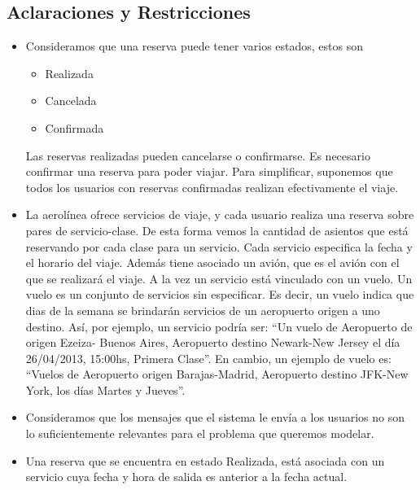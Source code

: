 \subsection{Aclaraciones y Restricciones}
  \begin{itemize}
    \item Consideramos que una reserva puede tener varios estados, estos son
          \begin{itemize}
            \item   Realizada
            \item   Cancelada
            \item   Confirmada
          \end{itemize}

          Las reservas realizadas pueden cancelarse o confirmarse.
          Es necesario confirmar una reserva para poder viajar.
          Para simplificar, suponemos que todos los usuarios con reservas
          confirmadas realizan efectivamente el viaje.
    
    \item La aerolínea ofrece servicios de viaje, y cada usuario realiza una
          reserva sobre pares de servicio-clase.
          De esta forma vemos la cantidad de asientos que está reservando por
          cada clase para un servicio.
          Cada servicio especifica la fecha y el horario del viaje. Además 
          tiene asociado un avión, que es el avión con el que se realizará
          el viaje.
          A la vez un servicio está vinculado con un vuelo. Un vuelo es
          un conjunto de servicios sin especificar. Es decir, un vuelo indica 
          que dias de la semana se brindarán servicios de un aeropuerto origen 
          a uno destino.
          Así, por ejemplo, un servicio podría ser:
          ``Un vuelo de Aeropuerto de origen Ezeiza- Buenos Aires, Aeropuerto 
          destino Newark-New Jersey el día 26/04/2013, 15:00hs, Primera Clase''.
          En cambio, un ejemplo de vuelo es:
         ``Vuelos de Aeropuerto origen Barajas-Madrid, Aeropuerto destino 
          JFK-New York, los días Martes y Jueves''.
	
    \item Consideramos que los mensajes que el sistema le envía a los usuarios
          no son lo suficientemente relevantes para el problema que queremos
          modelar.
          
    \item Una reserva que se encuentra en estado Realizada, está asociada 
          con un servicio cuya fecha y hora de salida es anterior a la 
          fecha actual.
    	  

\end{itemize}
